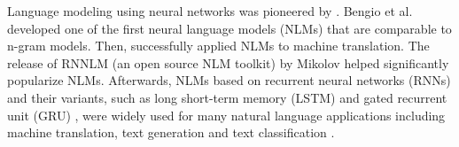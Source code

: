 \documentclass[conference]{IEEEtran}
\begin{document}
Language modeling using neural networks was pioneered by \cite{rumelhart1985learning, elman1990finding, mahoney2000fast}.  
Bengio et al. \cite{bengio2000neural} developed one of the first neural language models (NLMs) that are comparable to n-gram models. 
Then, \cite{schwenk2006continuous} successfully applied NLMs to machine translation. 
The release of RNNLM (an open source NLM toolkit) by Mikolov  \cite{mikolov2011strategies, rnnlm} helped significantly popularize NLMs. 
Afterwards, NLMs based on recurrent neural networks (RNNs) and their variants, such as long short-term memory (LSTM) \cite{sutskever2014sequence} and gated recurrent unit (GRU) \cite{cho2014properties}, were widely used for many natural language applications including machine translation, text generation and text classification \cite{minaee2021deep}.
\end{document}
